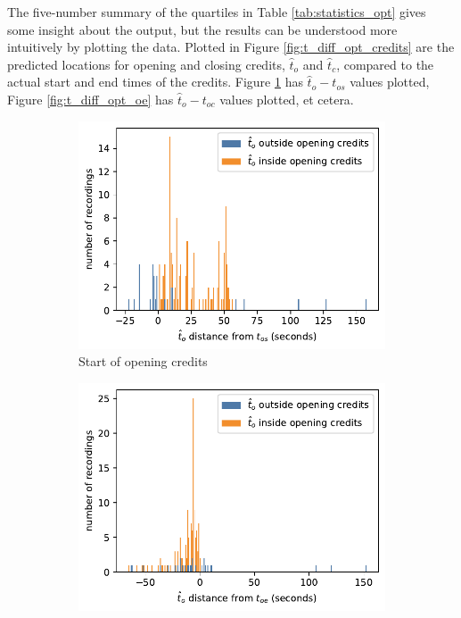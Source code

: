 The five-number summary of the quartiles in Table \ref{tab:statistics_opt} gives some insight about the output, but the results can be understood more intuitively by plotting the data. Plotted in Figure \ref{fig:t_diff_opt_credits} are the predicted locations for opening and closing credits, $\hat{t}_o$ and $\hat{t}_c$, compared to the actual start and end times of the credits. Figure \ref{fig:t_diff_opt_os} has $\hat{t}_o-t_{os}$ values plotted, Figure \ref{fig:t_diff_opt_oe} has $\hat{t}_o-t_{oc}$ values plotted, et cetera.

\begin{figure}[h]
  \begin{subfigure}[t]{.49\textwidth}
    \centering
    \includegraphics[width=\linewidth]{../plots/distances/opt_l2_dist_start_first.pdf}
    \caption{Start of opening credits}
    \label{fig:t_diff_opt_os}
  \end{subfigure}
  \hfill
  \begin{subfigure}[t]{.49\textwidth}
    \centering
    \includegraphics[width=\linewidth]{../plots/distances/opt_l2_dist_start_last.pdf}

\end{subfigure}
\end{figure}

